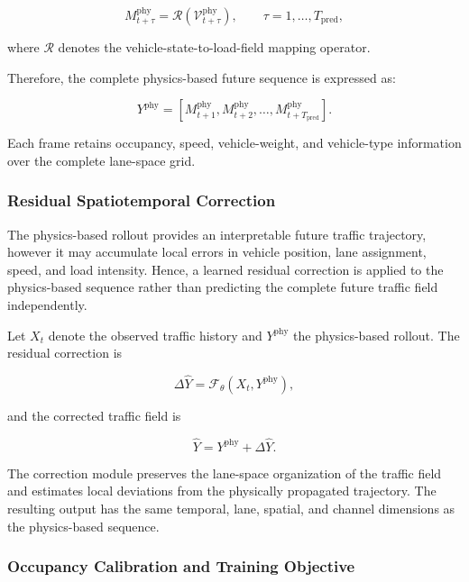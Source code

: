 \documentclass[journal]{IEEEtran}
\begin{document}
\begin{equation}
M_{t+\tau}^{\mathrm{phy}}
=
\mathcal{R}\left(
\mathcal{V}_{t+\tau}^{\mathrm{phy}}
\right),
\qquad
\tau=1,\ldots,T_{\mathrm{pred}},
\end{equation}

where $\mathcal{R}$ denotes the vehicle-state-to-load-field mapping operator.

Therefore, the complete physics-based future sequence is expressed as:

\begin{equation}
Y^{\mathrm{phy}}
=
\left[
M_{t+1}^{\mathrm{phy}},
M_{t+2}^{\mathrm{phy}},
\ldots,
M_{t+T_{\mathrm{pred}}}^{\mathrm{phy}}
\right].
\end{equation}

Each frame retains occupancy, speed, vehicle-weight, and vehicle-type information over the complete lane-space grid.


\subsubsection{Residual Spatiotemporal Correction}

The physics-based rollout provides an interpretable future traffic trajectory, however it may accumulate local errors in vehicle position, lane assignment, speed, and load intensity. Hence, a learned residual correction is applied to the physics-based sequence rather than predicting the complete future traffic field independently.

Let $X_t$ denote the observed traffic history and $Y^{\mathrm{phy}}$ the physics-based rollout. The residual correction is

\begin{equation}
\Delta\widehat{Y}
=
\mathcal{F}_{\theta}
\left(
X_t,
Y^{\mathrm{phy}}
\right),
\end{equation}

and the corrected traffic field is

\begin{equation}
\widehat{Y}
=
Y^{\mathrm{phy}}
+
\Delta\widehat{Y}.
\end{equation}

The correction module preserves the lane-space organization of the traffic field and estimates local deviations from the physically propagated trajectory. The resulting output has the same temporal, lane, spatial, and channel dimensions as the physics-based sequence.


\subsubsection{Occupancy Calibration and Training Objective}
\label{sec:occupancy_training}
\end{document}
